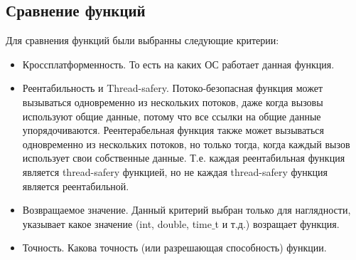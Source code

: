 \documentclass{article}
\begin{document}
			\subsection{Сравнение функций}			
			
			Для сравнения функций были выбранны следующие критерии:
			\begin{itemize}
				\item Кроссплатформенность. То есть на каких ОС работает данная функция.
				\item Реентабильность и Thread-safery. Потоко-безопасная функция может вызываться одновременно из нескольких 							потоков, даже когда вызовы используют общие данные, потому что все ссылки на общие данные упорядочиваются.
					Реентерабельная функция также может вызываться одновременно из нескольких потоков, но только тогда, когда 							каждый вызов использует свои собственные данные. Т.е. каждая реентабильная функция является thread-safery 							функцией, но не каждая thread-safery функция является реентабильной.
				\item Возвращаемое значение. Данный критерий выбран только для наглядности, указывает какое значение (int, 								double, time$\_$t и т.д.) возращает функция.
				\item Точность. Какова точность (или разрешающая способность) функции.
			\end{itemize}
			
\end{document}
